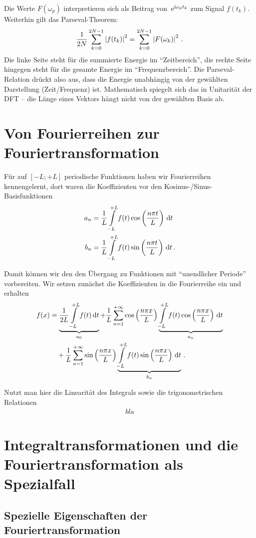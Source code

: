 \documentclass[paper=a4, fontsize=11.0pt, abstractoff, DIV12]{scrartcl}
\begin{document}
Die Werte $F(\omega_p)$ interpretieren sich als Beitrag  von
$\,{\mathrm{e}}^{\mathrm{i}\omega_p t_k}$ zum Signal $f(t_k)$. Weiterhin gilt das
Parseval-Theorem:
\begin{align}
\frac{1}{2N}\sum\limits_{k=0}^{2N-1}\left\vert f(t_k) \right\vert^2 = \sum\limits_{k=0}^{2N-1}\left\vert F(\omega_k) \right\vert^2\,.
\end{align}
Die linke Seite steht für die summierte Energie im ``Zeitbereich'', die
rechte Seite hingegen steht für die gesamte Energie im ``Frequenzbereich''.
Die Parseval-Relation drückt also aus, dass die Energie unabhängig von der
gewählten Darstellung (Zeit/Frequenz) ist. Mathematisch spiegelt sich das in
Unitarität der DFT -- die Länge eines Vektors hängt nicht von der gewählten
Basis ab.

\section{Von Fourierreihen zur Fouriertransformation}

Für auf $[-L;+L]$ periodische Funktionen haben wir Fourierreihen
kennengelernt, dort waren die Koeffizienten vor den Kosinus-/Sinus-Basisfunktionen
\begin{align*}
a_n &= \frac{1}{L}\int\limits_{-L}^{+L} f(t) \cos\left(\frac{n\pi t}{L}\right)\,\mathrm{d} t\\
b_n &= \frac{1}{L}\int\limits_{-L}^{+L} f(t) \sin\left(\frac{n\pi t}{L}\right)\,\mathrm{d} t\,.
\end{align*}

Damit können wir den den Übergang zu Funktionen mit ``unendlicher Periode''
vorbereiten. Wir setzen zunächst die Koeffizienten in die Fourierreihe ein
und erhalten
\begin{align}
f(x) &= \underbrace{\frac{1}{2L} \int\limits_{-L}^{+L}f(t)\,\mathrm{d} t}_{a_0} + \frac{1}{L}\sum\limits_{n=1}^{+\infty}\cos\left(\frac{n\pi x}{L}\right)\underbrace{\int\limits_{-L}^{+L}f(t)\cos\left(\frac{n \pi x}{L}\right)\,\mathrm{d} t}_{a_n} \nonumber\\ &\quad + \frac{1}{L}\sum\limits_{n=1}^{+\infty}\sin\left(\frac{n\pi x}{L}\right)\underbrace{\int\limits_{-L}^{+L}f(t)\sin\left(\frac{n \pi x}{L}\right)\,\mathrm{d} t}_{b_n}\,.
\end{align}

Nutzt man hier die Linearität des Integrals sowie die trigonometrischen
Relationen
\begin{align*}
bla
\end{align*}


\section{Integraltransformationen und die Fouriertransformation als Spezialfall}

\subsection{Spezielle Eigenschaften der Fouriertransformation}

\nocite{*}




\end{document}
